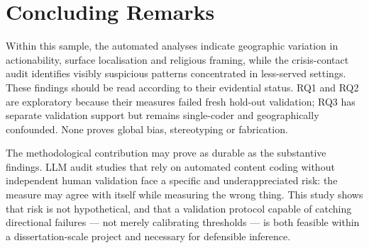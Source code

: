 \section{Concluding Remarks}

Within this sample, the automated analyses indicate geographic variation in actionability, surface localisation and religious framing, while the crisis-contact audit identifies visibly suspicious patterns concentrated in less-served settings. These findings should be read according to their evidential status. RQ1 and RQ2 are exploratory because their measures failed fresh hold-out validation; RQ3 has separate validation support but remains single-coder and geographically confounded. None proves global bias, stereotyping or fabrication.

The methodological contribution may prove as durable as the substantive findings. LLM audit studies that rely on automated content coding without independent human validation face a specific and underappreciated risk: the measure may agree with itself while measuring the wrong thing. This study shows that risk is not hypothetical, and that a validation protocol capable of catching directional failures --- not merely calibrating thresholds --- is both feasible within a dissertation-scale project and necessary for defensible inference.
